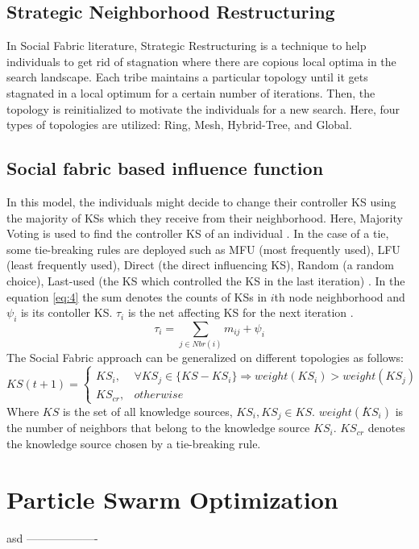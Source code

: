 \subsection{Strategic Neighborhood Restructuring}In Social Fabric literature, Strategic Restructuring is a technique to help individuals to get rid of stagnation where there are copious local optima in the search landscape. Each tribe maintains a particular topology until it gets stagnated in a local optimum for a certain number of iterations. Then, the topology is reinitialized to motivate the individuals for a new search. Here, four types of topologies are utilized: Ring, Mesh, Hybrid-Tree, and Global.
\subsection{Social fabric based influence function} In this model, the individuals might decide to change their controller KS using the majority of KSs which they receive from their neighborhood. Here, Majority Voting is used to find the controller KS of an individual \cite{che2010robust}. In the case of a tie, some tie-breaking rules are deployed such as MFU (most frequently used), LFU (least frequently used), Direct (the direct influencing KS), Random (a random choice), Last-used (the KS which controlled the KS in the last iteration) \cite{ali2012socio}. In the equation \ref{eq:4} the sum denotes the counts of KSs in $i$th node neighborhood and $\psi_{i}$ is its contoller KS. $\tau_{i}$ is the net affecting KS for the next iteration \cite{ali2016leveraged} \cite{sterling2004aggregation}. 
\begin{equation}
\label{eq:4}
\tau_{i}=\sum_{j \in Nbr(i)}m_{ij} + \psi_{i}
\end{equation}
The Social Fabric approach can be generalized on different topologies as follows:
\begin{equation}
	KS(t+1)=
		\begin{cases}
			KS_{i}, & \forall KS_{j}\in \{KS-KS_{i}\}\Rightarrow weight(KS_{i}) > weight(KS_{j}) \\
			KS_{cr}, & otherwise
		\end{cases}
\end{equation}
Where $KS$ is the set of all knowledge sources, $KS_{i}, KS_{j}\in KS$. $weight(ܵKS_{i})$ is the number of neighbors that belong to the knowledge source $KS_{i}$. $KS_{cr}$ denotes the knowledge source chosen by a tie-breaking rule.
\section{Particle Swarm Optimization}
asd
\newline ------------------- \newline














